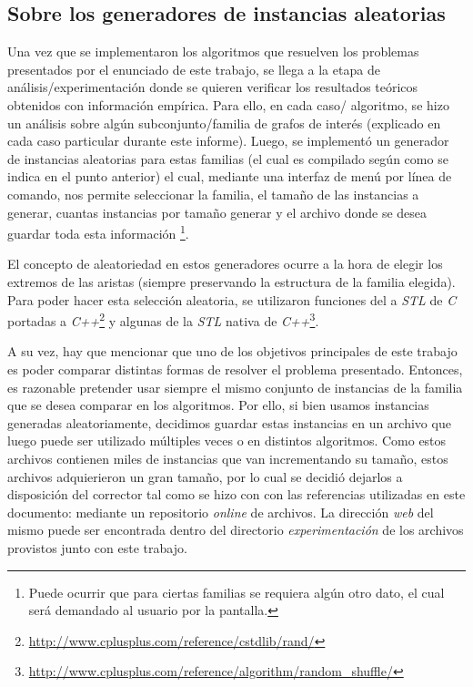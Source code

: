 \subsection*{Sobre los generadores de instancias aleatorias}
\par Una vez que se implementaron los algoritmos que resuelven los problemas
    presentados por el enunciado de este trabajo, se llega a la etapa de
    an\'alisis/experimentaci\'on donde se quieren verificar los resultados
    te\'oricos obtenidos con informaci\'on emp\'irica. Para ello, en cada caso/%
    algoritmo, se hizo un an\'alisis sobre alg\'un subconjunto/familia de grafos
    de inter\'es (explicado en cada caso particular durante este informe). Luego,
    se implement\'o un generador de instancias aleatorias para estas familias
    (el cual es compilado seg\'un como se indica en el punto anterior) el cual,
    mediante una interfaz de men\'u por l\'inea de comando, nos permite seleccionar
    la familia, el tama\~no de las instancias a generar, cuantas instancias por
    tama\~no generar y el archivo donde se desea guardar toda esta informaci\'on%
    \footnote{Puede ocurrir que para ciertas familias se requiera alg\'un otro dato,
    el cual ser\'a demandado al usuario por la pantalla.}.

\par El concepto de aleatoriedad en estos generadores ocurre a la hora de elegir
    los extremos de las aristas (siempre preservando la estructura de la familia
    elegida). Para poder hacer esta selecci\'on aleatoria, se utilizaron funciones
    del a \emph{STL} de \emph{C} portadas a \emph{C++}\footnote{%
    \url{http://www.cplusplus.com/reference/cstdlib/rand/}} y algunas de la
    \emph{STL} nativa de \emph{C++}\footnote{%
    \url{http://www.cplusplus.com/reference/algorithm/random_shuffle/}}.

\par A su vez, hay que mencionar que uno de los objetivos principales de este
    trabajo es poder comparar distintas formas de resolver el problema
    presentado. Entonces, es razonable pretender usar siempre el mismo conjunto
    de instancias de la familia que se desea comparar en los algoritmos. Por
    ello, si bien usamos instancias generadas aleatoriamente, decidimos guardar
    estas instancias en un archivo que luego puede ser utilizado m\'ultiples
    veces o en distintos algoritmos. Como estos archivos contienen miles de
    instancias que van incrementando su tama\~no, estos archivos adquierieron
    un gran tama\~no, por lo cual se decidi\'o dejarlos a disposici\'on del
    corrector tal como se hizo con con las referencias utilizadas en este
    documento: mediante un repositorio \emph{online} de archivos. La direcci\'on
    \emph{web} del mismo puede ser encontrada dentro del directorio \emph{%
    experimentaci\'on} de los archivos provistos junto con este trabajo.

